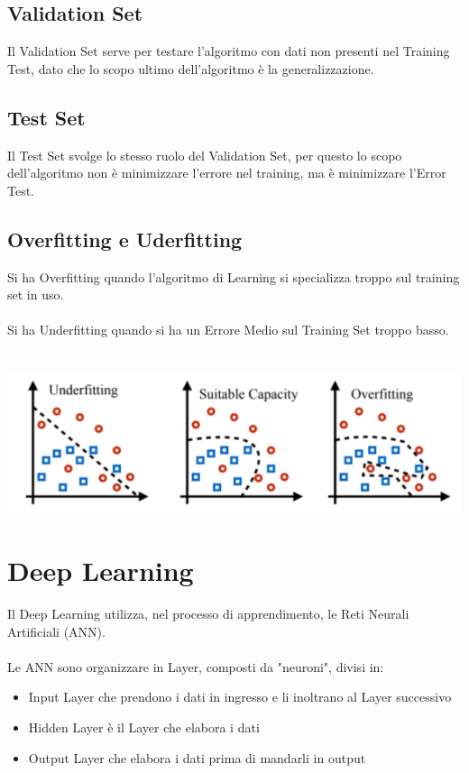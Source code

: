 \subsection{Validation Set}
Il Validation Set serve per testare l'algoritmo con dati non presenti nel Training Test, dato che lo scopo ultimo dell'algoritmo è la generalizzazione.

\subsection{Test Set}
Il Test Set svolge lo stesso ruolo del Validation Set, per questo lo scopo dell'algoritmo non è minimizzare l'errore nel training, ma è minimizzare l'Error Test.

\subsection{Overfitting e Uderfitting}
Si ha Overfitting quando l'algoritmo di Learning si specializza troppo sul training set in uso.\\ \\

Si ha Underfitting quando si ha un Errore Medio sul Training Set troppo basso.\\ \\
\begin{center}
    \includegraphics[width=\textwidth]{Images/UnderfittingOverfitting.png}
\end{center}


\section{Deep Learning}
Il Deep Learning utilizza, nel processo di apprendimento, le Reti Neurali Artificiali (ANN).\\ \\
Le ANN sono organizzare in Layer, composti da "neuroni", divisi in:
\begin{itemize}
    \item Input Layer che prendono i dati in ingresso e li inoltrano al Layer successivo
    \item Hidden Layer è il Layer che elabora i dati
    \item Output Layer che elabora i dati prima di mandarli in output
\end{itemize}

